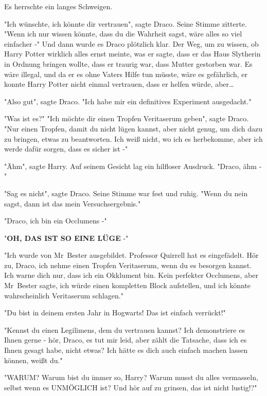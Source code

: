 {Es herrschte ein langes Schweigen.

"Ich wünschte, ich könnte dir vertrauen", sagte Draco. Seine Stimme zitterte. "Wenn ich nur wissen könnte, dass du die Wahrheit sagst, wäre alles so viel einfacher -" Und dann wurde es Draco plötzlich klar. Der Weg, um zu wissen, ob Harry Potter wirklich alles ernst meinte, was er sagte, dass er das Haus Slytherin in Ordnung bringen wollte, dass er traurig war, dass Mutter gestorben war. Es wäre illegal, und da er es ohne Vaters Hilfe tun müsste, wäre es gefährlich, er konnte Harry Potter nicht einmal vertrauen, dass er helfen würde, aber…

"Also gut", sagte Draco. "Ich habe mir ein definitives Experiment ausgedacht."

"Was ist es?" "Ich möchte dir einen Tropfen Veritaserum geben", sagte Draco. "Nur einen Tropfen, damit du nicht lügen kannst, aber nicht genug, um dich dazu zu bringen, etwas zu beantworten. Ich weiß nicht, wo ich es herbekomme, aber ich werde dafür sorgen, dass es sicher ist -"

"Ähm", sagte Harry. Auf seinem Gesicht lag ein hilfloser Ausdruck. "Draco, ähm -"

"Sag es nicht", sagte Draco. Seine Stimme war fest und ruhig. "Wenn du nein sagst, dann ist das mein Versuchsergebnis."

"Draco, ich bin ein Occlumens -"

"\textbf{OH, DAS IST SO EINE LÜGE} -"

"Ich wurde von Mr~Bester ausgebildet. Professor Quirrell hat es eingefädelt. Hör zu, Draco, ich nehme einen Tropfen Veritaserum, wenn du es besorgen kannst. Ich warne dich nur, dass ich ein Okklument bin. Kein perfekter Occlumens, aber Mr~Bester sagte, ich würde einen kompletten Block aufstellen, und ich könnte wahrscheinlich Veritaserum schlagen."

"Du bist in deinem ersten Jahr in Hogwarts! Das ist einfach verrückt!"

"Kennst du einen Legilimens, dem du vertrauen kannst? Ich demonstriere es Ihnen gerne - hör, Draco, es tut mir leid, aber zählt die Tatsache, dass ich es Ihnen gesagt habe, nicht etwas? Ich hätte es dich auch einfach machen lassen können, weißt du."

"WARUM? Warum bist du immer so, Harry? Warum musst du alles vermasseln, selbst wenn es UNMÖGLICH ist? Und hör auf zu grinsen, das ist nicht lustig!?"

}

